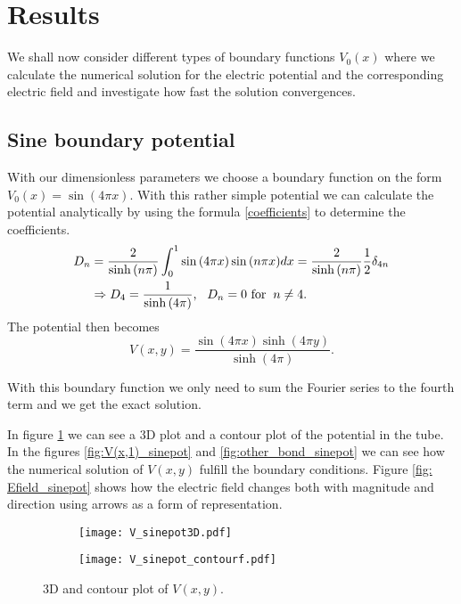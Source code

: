 \documentclass{article}
\begin{document}
\section*{Results}
We shall now consider different types of boundary functions $V_0(x)$ where we calculate the numerical solution for the electric potential and the corresponding electric field and investigate how fast the solution convergences. 

\subsection*{Sine boundary potential}
With our dimensionless parameters we choose a boundary function on the form $V_0(x)=\sin{(4\pi x)}$. With this rather simple potential we can calculate the potential analytically by using the formula \eqref{coefficients} to determine the coefficients.
\begin{equation}
\begin{split}
    D_n &= \frac{2}{\sinh{(n\pi)}} \int_0^1 \sin{(4\pi x)}\sin{(n\pi x)}dx = \frac{2}{\sinh{(n\pi)}} \frac{1}{2} \delta_{4n} \\ &\Rightarrow D_4 = \frac{1}{\sinh{(4\pi)}} \text{,} \hspace{3mm} D_n = 0 \text{ for} \hspace{2mm} n \neq 4.
\end{split}
\end{equation}
The potential then becomes 
\begin{equation}
    V(x,y) = \frac{\sin{(4\pi x)} \sinh{(4\pi y)}}{\sinh{(4\pi)}}.
\end{equation}

With this boundary function we only need to sum the Fourier series to the fourth term and we get the exact solution.

In figure \ref{fig: V_sinepot3D&contour} we can see a 3D plot and a contour plot of the potential in the tube. In the figures \ref{fig:V(x,1)_sinepot} and \ref{fig:other_bond_sinepot} we can see how the numerical solution of $V(x,y)$ fulfill the boundary conditions. Figure \ref{fig: Efield_sinepot} shows how the electric field changes both with magnitude and direction using arrows as a form of representation.

\begin{figure}[!htb]
     \centering
     \begin{subfigure}[b]{0.4\textwidth}
         \centering
         \texttt{[image: V\_sinepot3D.pdf]}
     \end{subfigure}
    \hspace{6em}
     \begin{subfigure}[b]{0.4\textwidth}
         \centering
         \texttt{[image: V\_sinepot\_contourf.pdf]}
     \end{subfigure}
    \caption{3D and contour plot of $V(x,y)$.}
    \label{fig: V_sinepot3D&contour}
\end{figure}
\end{document}

